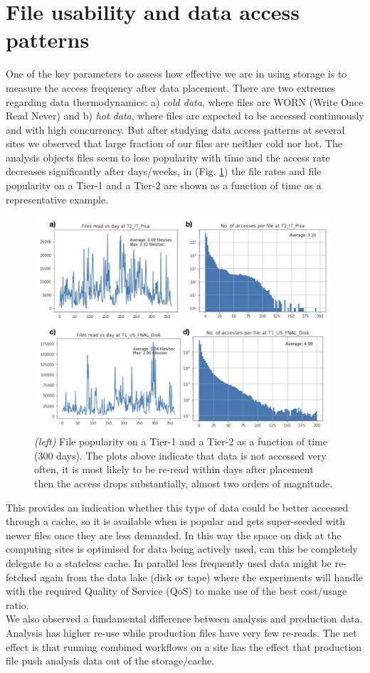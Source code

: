 \section{File usability and data access patterns}
One of the key parameters to assess how effective we are in using storage is to measure the access frequency after data placement. There are two extremes regarding data thermodynamics: a) \emph{cold data}, where files are WORN (Write Once Read Never) and b) \emph{hot data}, where files are expected to be accessed continuously and with high concurrency. But after studying data access patterns at several sites we observed that large fraction of our files are neither cold nor hot. The analysis objects files seem to lose popularity with time and the access rate decreases significantly after days/weeks, in (Fig. \ref{access}) the file rates and file popularity on a Tier-1 and a Tier-2 are shown as a function of time as a representative example.

\begin{figure}[h]
  \centering
  \includegraphics[height=8cm]{dataaccess-chep2019.png}
  \caption{{\em (left)} File popularity on a Tier-1 and a Tier-2 as a function of time (300 days). The plots above indicate that data is not accessed very often, it is most likely to be re-read within days after placement then the access drops substantially, almost two orders of magnitude.}
  \label{access}
\end{figure}

This provides an indication whether this type of data could be better accessed through a cache, so it is available when is popular and gets super-seeded with newer files once they are less demanded. In this way the space on disk at the computing sites is optimised for data being actively used, can this be completely delegate to a stateless cache. In parallel less frequently used data might be re-fetched again from the data lake (disk or tape) where the experiments will handle with the required Quality of Service (QoS) to make use of the best cost/usage ratio.\\
We also observed a fundamental difference between analysis and production data. Analysis has higher re-use while production files have very few re-reads. The net effect is that running combined workflows on a site has the effect that production file push analysis data out of the storage/cache.


